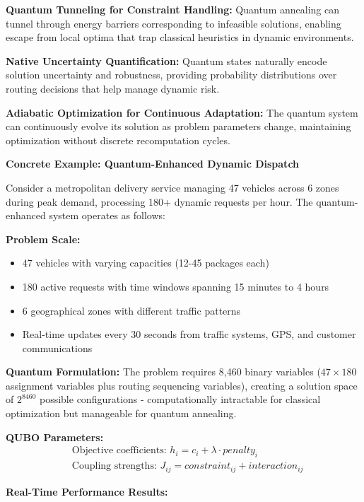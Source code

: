 \documentclass{article}
\begin{document}
\textbf{Quantum Tunneling for Constraint Handling:} Quantum annealing can tunnel through energy barriers corresponding to infeasible solutions, enabling escape from local optima that trap classical heuristics in dynamic environments.

\textbf{Native Uncertainty Quantification:} Quantum states naturally encode solution uncertainty and robustness, providing probability distributions over routing decisions that help manage dynamic risk.

\textbf{Adiabatic Optimization for Continuous Adaptation:} The quantum system can continuously evolve its solution as problem parameters change, maintaining optimization without discrete recomputation cycles.

\textbf{Concrete Example: Quantum-Enhanced Dynamic Dispatch}

Consider a metropolitan delivery service managing 47 vehicles across 6 zones during peak demand, processing 180+ dynamic requests per hour. The quantum-enhanced system operates as follows:

\textbf{Problem Scale:}
\begin{itemize}
\item 47 vehicles with varying capacities (12-45 packages each)
\item 180 active requests with time windows spanning 15 minutes to 4 hours
\item 6 geographical zones with different traffic patterns
\item Real-time updates every 30 seconds from traffic systems, GPS, and customer communications
\end{itemize}

\textbf{Quantum Formulation:}
The problem requires 8,460 binary variables ($47 \times 180$ assignment variables plus routing sequencing variables), creating a solution space of $2^{8460}$ possible configurations - computationally intractable for classical optimization but manageable for quantum annealing.

\textbf{QUBO Parameters:}
\begin{align}
&\text{Objective coefficients: } h_i = c_i + \lambda \cdot penalty_i \\
&\text{Coupling strengths: } J_{ij} = constraint_{ij} + interaction_{ij}
\end{align}

\textbf{Real-Time Performance Results:}
\end{document}
